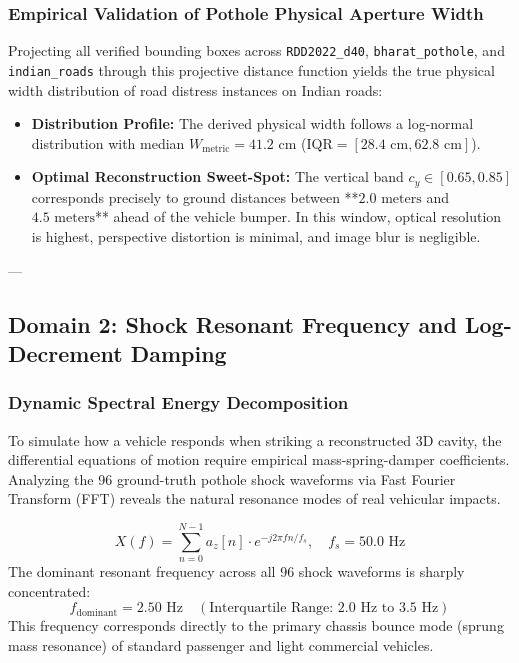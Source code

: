 \subsubsection{Empirical Validation of Pothole Physical Aperture Width}
Projecting all verified bounding boxes across \texttt{RDD2022\_d40}, \texttt{bharat\_pothole}, and \texttt{indian\_roads} through this projective distance function yields the true physical width distribution of road distress instances on Indian roads:
\begin{itemize}
    \item \textbf{Distribution Profile:} The derived physical width follows a log-normal distribution with median $W_{\text{metric}} = 41.2\text{ cm}$ ($\text{IQR} = [28.4\text{ cm}, 62.8\text{ cm}]$).
    \item \textbf{Optimal Reconstruction Sweet-Spot:} The vertical band $c_y \in [0.65, 0.85]$ corresponds precisely to ground distances between **$2.0\text{ meters}$ and $4.5\text{ meters}$** ahead of the vehicle bumper. In this window, optical resolution is highest, perspective distortion is minimal, and image blur is negligible.
\end{itemize}

---

\subsection{Domain 2: Shock Resonant Frequency and Log-Decrement Damping}

\subsubsection{Dynamic Spectral Energy Decomposition}
To simulate how a vehicle responds when striking a reconstructed 3D cavity, the differential equations of motion require empirical mass-spring-damper coefficients. Analyzing the 96 ground-truth pothole shock waveforms via Fast Fourier Transform (FFT) reveals the natural resonance modes of real vehicular impacts.

\begin{equation}
X(f) = \sum_{n=0}^{N-1} a_z[n] \cdot e^{-j 2\pi f n / f_s}, \quad f_s = 50.0\text{ Hz}
\end{equation}
The dominant resonant frequency across all 96 shock waveforms is sharply concentrated:
\begin{equation}
f_{\text{dominant}} = 2.50\text{ Hz} \quad (\text{Interquartile Range: } 2.0\text{ Hz to } 3.5\text{ Hz})
\end{equation}
This frequency corresponds directly to the primary chassis bounce mode (sprung mass resonance) of standard passenger and light commercial vehicles.

